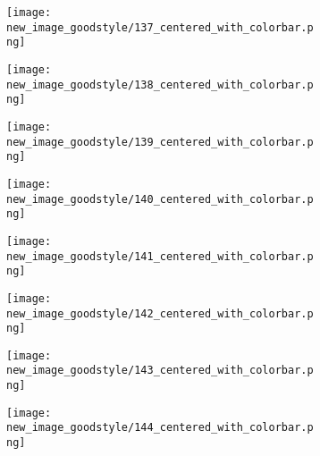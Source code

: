\documentclass[a4paper,12pt]{article}
\begin{document}
\begin{figure}[H]
  \begin{subfigure}{0.11\textwidth}
    \texttt{[image: new\_image\_goodstyle/137\_centered\_with\_colorbar.png]}
  \end{subfigure}
  \hfill
  \begin{subfigure}{0.11\textwidth}
    \texttt{[image: new\_image\_goodstyle/138\_centered\_with\_colorbar.png]}
  \end{subfigure}
  \hfill
  \begin{subfigure}{0.11\textwidth}
    \texttt{[image: new\_image\_goodstyle/139\_centered\_with\_colorbar.png]}
  \end{subfigure}
  \hfill
  \begin{subfigure}{0.11\textwidth}
    \texttt{[image: new\_image\_goodstyle/140\_centered\_with\_colorbar.png]}
  \end{subfigure}
  \hfill
  \begin{subfigure}{0.11\textwidth}
    \texttt{[image: new\_image\_goodstyle/141\_centered\_with\_colorbar.png]}
  \end{subfigure}
  \hfill
  \begin{subfigure}{0.11\textwidth}
    \texttt{[image: new\_image\_goodstyle/142\_centered\_with\_colorbar.png]}
  \end{subfigure}
  \hfill
  \begin{subfigure}{0.11\textwidth}
    \texttt{[image: new\_image\_goodstyle/143\_centered\_with\_colorbar.png]}
  \end{subfigure}
  \hfill
  \begin{subfigure}{0.11\textwidth}
    \texttt{[image: new\_image\_goodstyle/144\_centered\_with\_colorbar.png]}
  \end{subfigure}
  \hfill
\end{figure}
\end{document}
